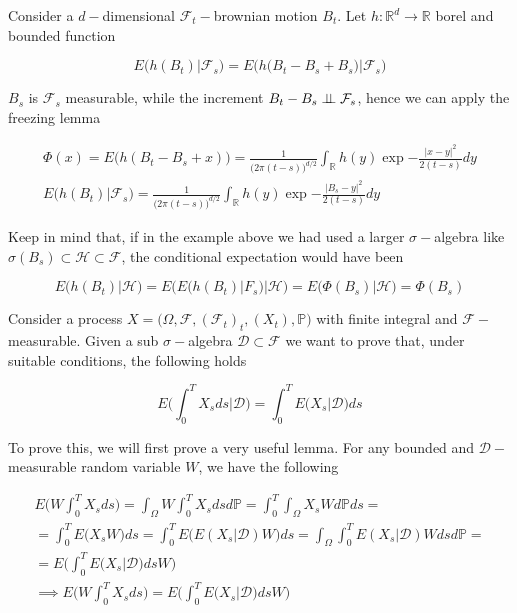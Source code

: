 Consider a $d-$dimensional $\mathcal{F}_t-$brownian motion $B_t$. Let $h : \mathbb{R}^d \to \mathbb{R}$ borel and bounded function

\begin{equation*}
    E\Big( h(B_t) \vert \mathcal{F}_s \Big) = E\Big( h\big(B_t - B_s + B_s\big) \vert \mathcal{F}_s \Big) 
\end{equation*}

$B_s$ is $\mathcal{F}_s$ measurable, while the increment $B_t-B_s \perp \!\!\! \perp \mathcal{F}_s$, hence we can apply the freezing lemma 

\begin{gather*}
    \Phi(x) = E\Big( h(B_t-B_s+x) \Big) = \frac{1}{\big(2 \pi (t-s)\big)^{d/2}}\int_{\mathbb{R}} h(y) \exp{-\frac{\vert x-y \vert^2}{2(t-s)}} dy \\
    E\Big( h(B_t) \vert \mathcal{F}_s \Big) = \frac{1}{\big(2 \pi (t-s)\big)^{d/2}}\int_{\mathbb{R}} h(y) \exp{-\frac{\vert B_s-y \vert^2}{2(t-s)}} dy
\end{gather*}

Keep in mind that, if in the example above we had used a larger $\sigma-$algebra like $\sigma(B_s) \subset \mathcal{H} \subset \mathcal{F}$, the conditional expectation would have been

\begin{equation*}
    E\Big( h(B_t) \big\vert \mathcal{H} \Big) = E\Bigg( E\Big( h(B_t) \big\vert F_s \Big) \Big\vert \mathcal{H} \Bigg) = E\Big( \Phi(B_s) \big\vert \mathcal{H} \Big) = \Phi(B_s) 
\end{equation*}

Consider a process $X =\big(\Omega, \mathcal{F}, (\mathcal{F}_t)_t, (X_t),\mathbb{P}\big)$ with finite integral and $\mathcal{F}-$measurable. Given a sub $\sigma-$algebra $\mathcal{D} \subset \mathcal{F}$ we want to prove that, under suitable conditions, the following holds

\begin{equation}
    E\Bigg( \int_0^T X_s ds \Big\vert \mathcal{D} \Bigg) = \int_0^T E\Big( X_s \big\vert \mathcal{D} \Big) ds
\end{equation}

To prove this, we will first prove a very useful lemma. For any bounded and $\mathcal{D}-$measurable random variable $W$, we have the following

\begin{gather*}
    E\Bigg( W \int_0^T X_s  ds \Bigg) = \int_{\Omega} W \int_0^T X_s ds d\mathbb{P} = \int_0^T \int_{\Omega} X_s W d\mathbb{P} ds = \\
    = \int_0^T E\big( X_s W \big) ds = \int_0^T E\big( E(X_s\vert \mathcal{D}) W \big) ds = \int_{\Omega} \int_0^T  E(X_s \vert \mathcal{D}) W ds d\mathbb{P} = \\
    = E\Bigg( \int_0^T E\big( X_s \vert \mathcal{D} \big) ds W\Bigg) \\
    \implies E\Bigg( W \int_0^T X_s  ds \Bigg) = E\Bigg( \int_0^T E\big( X_s \vert \mathcal{D} \big) ds W\Bigg)
\end{gather*}

